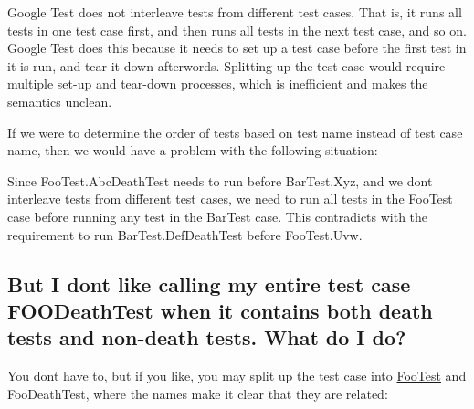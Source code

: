 Google Test does not interleave tests from different test cases. That is, it runs all tests in one test case first, and then runs all tests in the next test case, and so on. Google Test does this because it needs to set up a test case before the first test in it is run, and tear it down afterwords. Splitting up the test case would require multiple set-\/up and tear-\/down processes, which is inefficient and makes the semantics unclean.

If we were to determine the order of tests based on test name instead of test case name, then we would have a problem with the following situation\+:


\begin{DoxyCode}{0}
\DoxyCodeLine{}
\end{DoxyCode}


Since {\ttfamily Foo\+Test.\+Abc\+Death\+Test} needs to run before {\ttfamily Bar\+Test.\+Xyz}, and we don\textquotesingle{}t interleave tests from different test cases, we need to run all tests in the {\ttfamily \mbox{\hyperlink{class_foo_test}{Foo\+Test}}} case before running any test in the {\ttfamily Bar\+Test} case. This contradicts with the requirement to run {\ttfamily Bar\+Test.\+Def\+Death\+Test} before {\ttfamily Foo\+Test.\+Uvw}.

\subsection*{But I don\textquotesingle{}t like calling my entire test case F\+O\+O\+Death\+Test when it contains both death tests and non-\/death tests. What do I do?}

You don\textquotesingle{}t have to, but if you like, you may split up the test case into {\ttfamily \mbox{\hyperlink{class_foo_test}{Foo\+Test}}} and {\ttfamily Foo\+Death\+Test}, where the names make it clear that they are related\+:


\begin{DoxyCode}{0}
\DoxyCodeLine{}
\DoxyCodeLine{}
\DoxyCodeLine{}
\end{DoxyCode}


